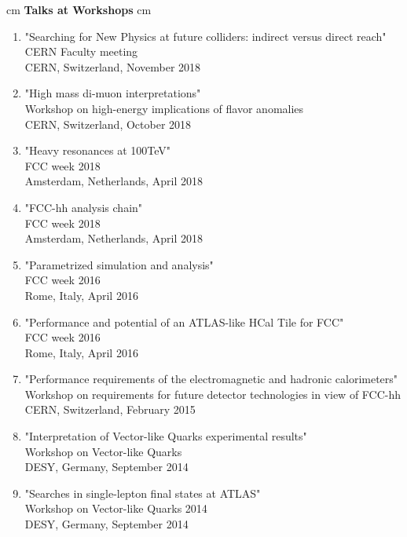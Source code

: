 \documentclass[12pt]{article}
\begin{document}
 cm
{\bf  \large  Talks at Workshops}
 cm
\begin{enumerate} 
\item "Searching for New Physics at future colliders: indirect versus direct reach"\\
CERN Faculty meeting\\
CERN, Switzerland, November 2018

\item "High mass di-muon interpretations"\\
Workshop on high-energy implications of flavor anomalies\\
CERN, Switzerland, October 2018

\item "Heavy resonances at 100TeV"\\
FCC week 2018\\
Amsterdam, Netherlands, April 2018

\item "FCC-hh analysis chain"\\
FCC week 2018\\
Amsterdam, Netherlands, April 2018

\item "Parametrized simulation and analysis"\\
FCC week 2016\\
Rome, Italy, April 2016

\item "Performance and potential of an ATLAS-like HCal Tile for FCC"\\
FCC week 2016\\
Rome, Italy, April 2016

\item "Performance requirements of the electromagnetic and hadronic calorimeters"\\
Workshop on requirements for future detector technologies in view of FCC-hh\\
CERN, Switzerland, February 2015

\item "Interpretation of Vector-like Quarks experimental results"\\
Workshop on Vector-like Quarks\\
DESY, Germany, September 2014

\item "Searches in single-lepton final states at ATLAS"\\
Workshop on Vector-like Quarks 2014 \\
DESY, Germany, September 2014


\end{enumerate}
\end{document}
